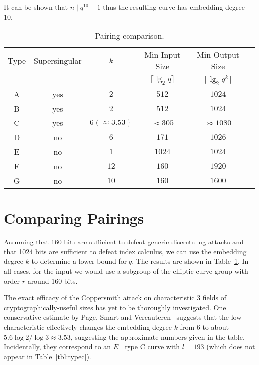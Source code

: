 It can be shown that $n \mid q^{10} - 1$ thus the resulting curve has
embedding degree 10.

\begin{table}
\begin{center}
\begin{tabular}{|c|c|c|c|c|c|}

  \hline
  Type & Supersingular & $k$ & Min Input Size & Min Output Size \\
        &     & & $\lceil \lg_2 q \rceil$ & $\lceil \lg_2 {q^k} \rceil$ \\

  \hline
  A & yes & $2$ & $512$ & $1024$ \\
  \hline
  B & yes & $2$ & $512$ & $1024$ \\
  \hline
  C & yes & $6(\approx 3.53)$ & $\approx 305$ & $\approx 1080$ \\
  \hline
  D & no & $6$ & $171$ & $1026$ \\
  \hline
  E & no & $1$ & $1024$ & $1024$ \\
  \hline
  F & no & $12$ & $160$ & $1920$ \\
  \hline
  G & no & $10$ & $160$ & $1600$ \\
  \hline
\end{tabular}
\end{center}
\caption{\label{tbl:comparepairings}
    Pairing comparison.
}
\end{table}

\section {\label{sec:comparingpairings}Comparing Pairings}

Assuming that 160 bits are sufficient to defeat generic discrete log attacks
and that 1024 bits are sufficient to defeat index calculus, we can use
the embedding degree $k$ to determine a lower bound for $q$.
The results are shown in Table~\ref{tbl:comparepairings}.
In all cases, for the input we would use a subgroup of the elliptic curve group
with order $r$ around 160 bits.

The exact efficacy of the Coppersmith attack on characteristic 3 fields
of cryptographically-useful sizes has yet to be thoroughly investigated.
One conservative estimate by Page, Smart and Vercauteren~\cite{psv}
suggests that the low characteristic
effectively changes the embedding degree $k$ from $6$ to about $5.6 \log 2 / \log 3 \approx 3.53$, suggesting the approximate numbers given in the table.
Incidentally, they correspond to an $E^-$ type C curve with $l=193$
(which does not appear
in Table~\ref{tbl:typec}).

